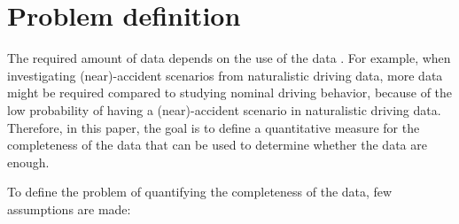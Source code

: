 \section{Problem definition}
\label{sec:problem}

The required amount of data depends on the use of the data \cite{wang2017much}. For example, when investigating (near)-accident scenarios from naturalistic driving data, more data might be required compared to studying nominal driving behavior, because of the low probability of having a (near)-accident scenario in naturalistic driving data. Therefore, in this paper, the goal is to define a quantitative measure for the completeness of the data that can be used to determine whether the data are enough.

To define the problem of quantifying the completeness of the data, few assumptions are made:
